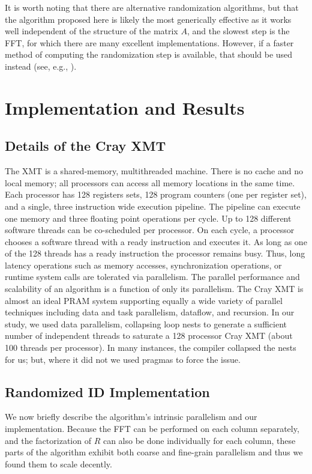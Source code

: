 \documentclass[11pt]{article}
\begin{document}
It is worth noting that there are alternative randomization algorithms, but that the algorithm proposed here is likely the most generically effective as it works well independent of the structure of the matrix $A$, and the slowest step is the FFT, for which there are many excellent implementations.  However, if a faster method of computing the randomization step is available, that should be used instead (see, e.g., \cite{rokyale1, rokpnas}).   



\section{Implementation and Results}
\label{sec:xmt}
\subsection{Details of the Cray XMT}
The XMT is a shared-memory, multithreaded machine.  There is no cache and no local memory; all processors can access all memory locations in the same time.  Each processor has 128 registers sets, 128 program counters (one per register set), and a single, three instruction wide execution pipeline.  The pipeline can execute one memory and three floating point operations per cycle.  Up to 128 different software threads can be co-scheduled per processor.  On each cycle, a processor chooses a software thread with a ready instruction and executes it.  As long as one of the 128 threads has a ready instruction the processor remains busy.  Thus, long latency operations such as memory accesses, synchronization operations, or runtime system calls are tolerated via parallelism.  The parallel performance and scalability of an algorithm is a function of only its parallelism.  The Cray XMT is almost an ideal PRAM system supporting equally a wide variety of parallel techniques including data and task parallelism, dataflow, and recursion.  In our study, we used data parallelism, collapsing loop nests to generate a sufficient number of independent threads to saturate a 128 processor Cray XMT (about 100 threads per processor). In many instances, the compiler collapsed the nests for us; but, where it did not we used pragmas to force the issue. 
\subsection{Randomized ID Implementation}
We now briefly describe the algorithm's intrinsic parallelism and our implementation.  Because the FFT can be performed on each column separately, and the factorization of $R$ can also be done individually for each column, these parts of the algorithm exhibit both coarse and fine-grain parallelism and thus we found them to scale decently.
\end{document}
